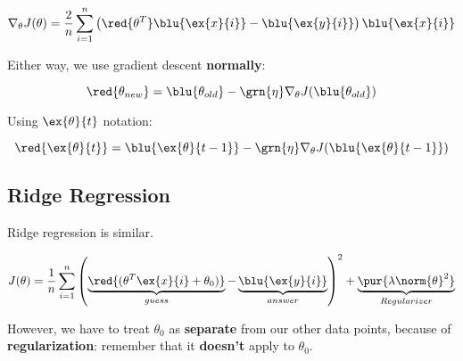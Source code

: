         \begin{equation}
            \nabla_\theta J(\theta) 
            = 
            \frac{2}{n} \sum_{i=1}^n
            \left(
                \red{\theta^T} \blu{\ex{x}{i}} - \blu{\ex{y}{i}}
            \right)
            \blu{\ex{x}{i}}
        \end{equation}
        
        Either way, we use gradient descent \textbf{normally}:
        
        \begin{equation*}
            \red{ \theta_{new} } 
            =  
            \blu{ \theta_{old} } 
            - \grn{ \eta } 
            \nabla_\theta J ( \blu{ \theta_{old} } )
        \end{equation*}
        
        Using $\ex{\theta}{t}$ notation:
        
        \begin{equation*}
            \red{ \ex{\theta}{t} } = 
            \blu{ \ex{\theta}{t-1} } -
            \grn{\eta} \nabla_\theta J ( \blu{ \ex{\theta}{t-1} })
        \end{equation*}
        
    \subsection*{Ridge Regression}
    
        Ridge regression is similar. 
        
        \begin{equation*}
                J(\theta) 
                = 
                \frac{1}{n}  \sum_{i=1}^n 
                \left( 
                    \underbrace{
                        \red{(\theta^T \ex{x}{i}  
                        + \theta_0)}
                    }_{guess}
                    - \underbrace{
                        \blu{\ex{y}{i}} 
                    }_{answer}
                \right)^2 
                + 
                \underbrace{
                    \pur{ \lambda \norm{\theta}^2 }
                }_{Regularizer}
            \end{equation*}
        
        However, we have to treat $\theta_0$ as \textbf{separate} from our other data points, because of \textbf{regularization}: remember that it \textbf{doesn't} apply to $\theta_0$.
        
